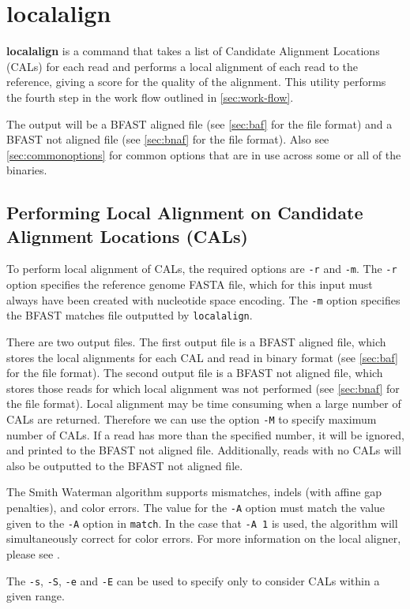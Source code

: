 \documentclass[a4paper,12pt]{book}
\newcommand{\TT}[1]{{\tt #1}} %
\newcommand{\BF}[1]{{\bf #1}} %
\newcommand{\rGFF}{reference genome FASTA file}
\newcommand{\BMF}{BFAST matches file} %
\newcommand{\BAF}{BFAST aligned file} %
\newcommand{\BNAF}{BFAST not aligned file} %
\begin{document}
\section{localalign}
\label{sec:localalign}
\BF{localalign} is a command that takes a list of Candidate Alignment Locations (CALs) for each read and performs a local alignment of each read to the reference, giving a score for the quality of the alignment.
This utility performs the fourth step in the work flow outlined in \autoref{sec:work-flow}.

The output will be a \BAF{} (see \autoref{sec:baf} for the file format) and a \BNAF{} (see \autoref{sec:bnaf} for the file format).
Also see \autoref{sec:commonoptions} for common options that are in use across some or all of the binaries.

\subsection{Performing Local Alignment on Candidate Alignment Locations (CALs)}
\label{sec:local-alignment}
To perform local alignment of CALs, the required options are \TT{-r} and \TT{-m}.
The \TT{-r} option specifies the \rGFF{}, which for this input must always have been created with nucleotide space encoding.
The \TT{-m} option specifies the \BMF{} outputted by \TT{localalign}.

There are two output files.
The first output file is a \BAF{}, which stores the local alignments for each CAL and read in binary format (see \autoref{sec:baf} for the file format).
The second output file is a \BNAF{}, which stores those reads for which local alignment was not performed (see \autoref{sec:bnaf} for the file format).
Local alignment may be time consuming when a large number of CALs are returned.
Therefore we can use the option \TT{-M} to specify maximum number of CALs.
If a read has more than the specified number, it will be ignored, and printed to the \BNAF{}.
Additionally, reads with no CALs will also be outputted to the \BNAF{}. 

The Smith Waterman algorithm supports mismatches, indels (with affine gap penalties), and color errors.
The value for the \TT{-A} option must match the value given to the \TT{-A} option in \TT{match}.
In the case that \TT{-A 1} is used, the algorithm will simultaneously correct for color errors.
For more information on the local aligner, please see \cite{BFAST-local-alignment}.

The \TT{-s}, \TT{-S}, \TT{-e} and \TT{-E} can be used to specify only to consider CALs within a given range.
\end{document}
